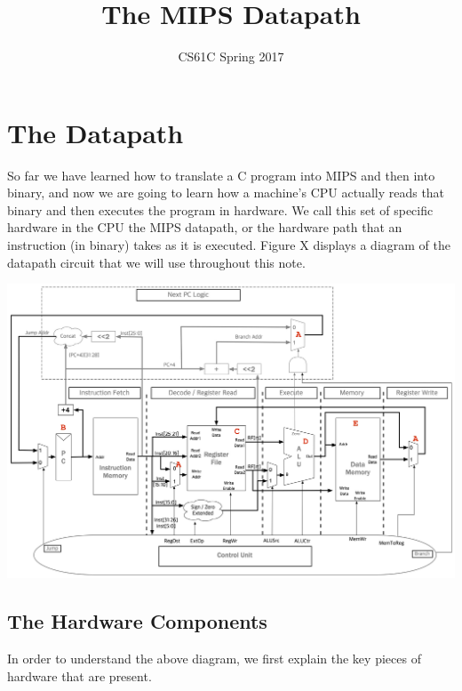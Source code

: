 \documentclass{article}
\title{The MIPS Datapath}
\author{CS61C Spring 2017}
\date{ }
\begin{document}
\maketitle
\tableofcontents
\newpage

\section{The Datapath}
So far we have learned how to translate a C program into MIPS and then into binary, and now we are going to learn how a machine's CPU actually reads that binary and then executes the program in hardware. We call this set of specific hardware in the CPU the MIPS datapath, or the hardware path that an instruction (in binary) takes as it is executed. Figure X displays a diagram of the datapath circuit that we will use throughout this note.

\begin{center}
\includegraphics[scale=0.15]{cpu-single-cycle}\newline
\end{center}
\subsection{The Hardware Components}
In order to understand the above diagram, we first explain the key pieces of hardware that are present.
\end{document}

